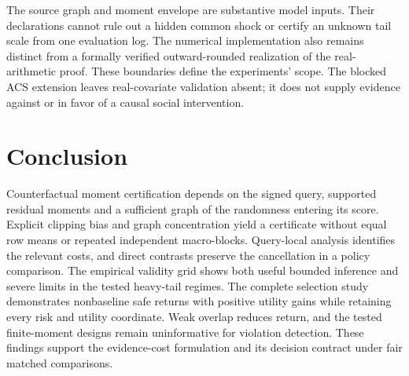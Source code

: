 The source graph and moment envelope are substantive model inputs.
Their declarations cannot rule out a hidden common shock or certify an
unknown tail scale from one evaluation log. The numerical implementation
also remains distinct from a formally verified outward-rounded realization
of the real-arithmetic proof. These boundaries define the experiments'
scope. The blocked ACS extension leaves real-covariate validation absent;
it does not supply evidence against or in favor of a causal social
intervention.

\section{Conclusion}

Counterfactual moment certification depends on the signed query, supported
residual moments and a sufficient graph of the randomness entering its
score. Explicit clipping bias and graph concentration yield a certificate
without equal row means or repeated independent macro-blocks. Query-local
analysis identifies the relevant costs, and direct contrasts preserve the
cancellation in a policy comparison. The empirical validity grid shows both
useful bounded inference and severe limits in the tested heavy-tail regimes.
The complete selection study demonstrates nonbaseline safe returns with
positive utility gains while retaining every risk and utility coordinate.
Weak overlap reduces return, and the tested finite-moment designs remain
uninformative for violation detection. These findings support the evidence-cost
formulation and its decision contract under fair matched comparisons.
